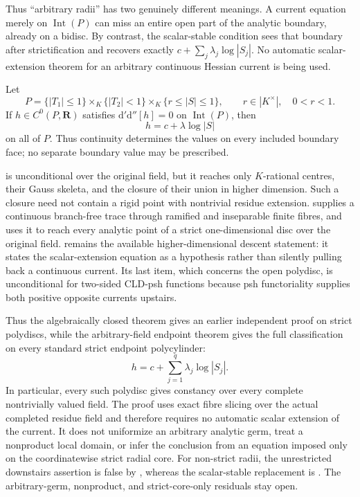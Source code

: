 Thus ``arbitrary radii'' has two genuinely different meanings.  A current
equation merely on \(\operatorname{Int}(P)\) can miss an entire open part of
the analytic boundary, already on a bidisc.  By contrast, the scalar-stable
condition sees that boundary after strictification and recovers exactly
\(c+\sum_j\lambda_j\log|S_j|\).  No automatic scalar-extension theorem for
an arbitrary continuous Hessian current is being used.

\begin{example}\label{ex:p062-mixed-endpoint-polycylinder}
Let
\[
 P=\{|T_1|\leq1\}\times_K\{|T_2|<1\}
   \times_K\{r\leq|S|\leq1\},
 \qquad r\in|K^\times|,\quad 0<r<1.
\]
If \(h\in C^0(P,\mathbf R)\) satisfies
\(
 \mathrm d'\mathrm d''[h]=0
\)
on \(\operatorname{Int}(P)\), then
\[
                         h=c+\lambda\log|S|
\]
on all of \(P\).  Thus continuity determines the values on every included
boundary face; no separate boundary value may be prescribed.
\end{example}

 is unconditional over the original
field, but it reaches only \(K\)-rational centres, their Gauss skeleta, and
the closure of their union in higher dimension.  Such a closure need not
contain a rigid point with nontrivial residue extension.
 supplies a continuous
branch-free trace through ramified and inseparable finite fibres, and
 uses it to reach every analytic point
of a strict one-dimensional disc over the original field.
 remains the available
higher-dimensional descent statement: it states the scalar-extension
equation as a hypothesis rather than silently pulling back a continuous
current.  Its last item, which concerns the open polydisc, is unconditional
for two-sided CLD-psh functions because psh functoriality supplies both
positive opposite currents upstairs.

Thus the algebraically closed theorem gives an earlier independent proof on
strict polydiscs, while the arbitrary-field endpoint theorem gives the full
classification on every standard strict endpoint polycylinder:
\[
                   h=c+\sum_{j=1}^{q}\lambda_j\log|S_j|.
\]
In particular, every such polydisc gives constancy over every complete
nontrivially valued field.  The proof uses exact fibre slicing over the
actual completed residue field and therefore requires no automatic scalar
extension of the current.  It does not uniformize an arbitrary analytic
germ, treat a nonproduct local domain, or infer the conclusion from an
equation imposed only on the coordinatewise strict radial core.  For
non-strict radii, the unrestricted downstairs assertion is false by
, whereas the
scalar-stable replacement is
.  The arbitrary-germ,
nonproduct, and strict-core-only residuals stay open.

